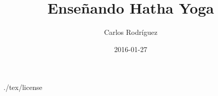 \documentclass[a4paper]{book}
\title{Enseñando Hatha Yoga}
\date{2016-01-27}
\author{Carlos Rodríguez}
\begin{document}
\maketitle


\frontmatter
 {./tex/license}
\tableofcontents


\mainmatter








\end{document}
